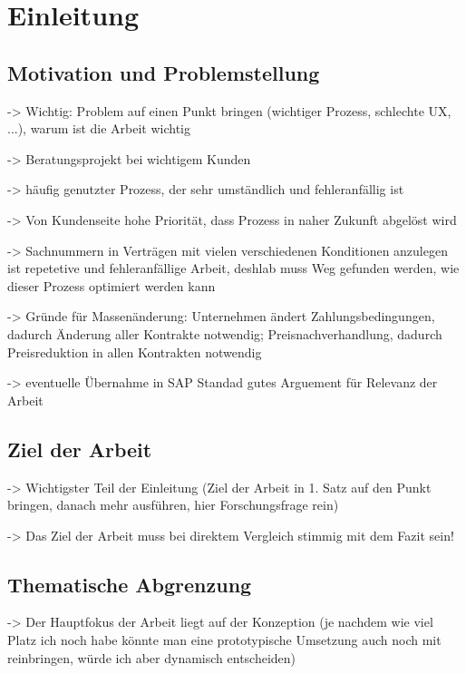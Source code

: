 \chapter{Einleitung}


\section{Motivation und Problemstellung}

-> Wichtig: Problem auf einen Punkt bringen (wichtiger Prozess, schlechte UX, ...), warum ist die Arbeit wichtig

-> Beratungsprojekt bei wichtigem Kunden

-> häufig genutzter Prozess, der sehr umständlich und fehleranfällig ist

-> Von Kundenseite hohe Priorität, dass Prozess in naher Zukunft abgelöst wird

-> Sachnummern in Verträgen mit vielen verschiedenen Konditionen anzulegen ist repetetive und fehleranfällige Arbeit, deshlab muss Weg gefunden werden, wie dieser Prozess optimiert werden kann

-> Gründe für Massenänderung: Unternehmen ändert Zahlungsbedingungen, dadurch Änderung aller Kontrakte notwendig; Preisnachverhandlung, dadurch Preisreduktion in allen Kontrakten notwendig

-> eventuelle Übernahme in SAP Standad gutes Arguement für Relevanz der Arbeit

\section{Ziel der Arbeit}

-> Wichtigster Teil der Einleitung (Ziel der Arbeit in 1. Satz auf den Punkt bringen, danach mehr ausführen, hier Forschungsfrage rein)

-> Das Ziel der Arbeit muss bei direktem Vergleich stimmig mit dem Fazit sein!


\section{Thematische Abgrenzung}

-> Der Hauptfokus der Arbeit liegt auf der Konzeption (je nachdem wie viel Platz ich noch habe könnte man eine prototypische Umsetzung auch noch mit reinbringen, würde ich aber dynamisch entscheiden)


